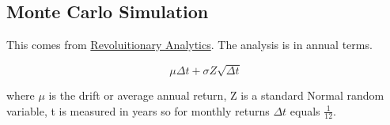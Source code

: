 \documentclass[12pt, a4paper, oneside]{article} %
\begin{document}
\subsection{Monte Carlo Simulation}
This comes from \href{http://blog.revolutionanalytics.com/2014/04/quantitative-finance-applications-in-r-5.html}{Revoluitionary Analytics}.  The analysis is in annual terms.  

\begin{equation}
\mu \Delta t + \sigma Z \sqrt{\Delta t}
\end{equation}

where $\mu$ is the drift or average annual return, Z is a standard Normal random variable, t is measured in years so for monthly returns $\Delta t$ equals $\frac{1}{12}$.
\end{document}
